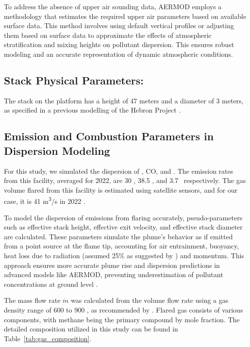 To address the absence of upper air sounding data, AERMOD employs a methodology that estimates the required upper air parameters based on available surface data. This method involves using default vertical profiles or adjusting them based on surface data to approximate the effects of atmospheric stratification and mixing heights on pollutant dispersion. This ensures robust modeling and an accurate representation of dynamic atmospheric conditions.

\subsection{Stack Physical Parameters:}
The stack on the platform has a height of 47 meters and a diameter of 3 meters, as specified in a previous modelling of the Hebron Project \cite{Hebron2010}.

\subsection{Emission and Combustion Parameters in Dispersion Modeling}

For this study, we simulated the dispersion of \NOtwo, CO, and \PMtwoFive. The emission rates from this facility, averaged for 2022, are 30 \gs, 38.5 \gs, and 3.7 \gs~respectively. The gas volume flared from this facility is estimated using satellite sensors, and for our case, it is 41 m\textsuperscript{3}/s in 2022 \cite{WorldBankFlaring}.

To model the dispersion of emissions from flaring accurately, pseudo-parameters such as effective stack height, effective exit velocity, and effective stack diameter are calculated. These parameters simulate the plume's behavior as if emitted from a point source at the flame tip, accounting for air entrainment, buoyancy, heat loss due to radiation (assumed  25\% as suggested by \cite{idriss2003emergency}) and momentum. This approach ensures more accurate plume rise and dispersion predictions in advanced models like AERMOD, preventing underestimation of pollutant concentrations at ground level \cite{Ontario2024}.

The mass flow rate $\dot{m}$ was calculated from the volume flow rate using a gas density range of 600 to 900 \GramMeterCube, as recommended by \cite{elsharkawy2004efficient}. Flared gas consists of various components, with methane being the primary compound by mole fraction. The detailed composition utilized in this study can be found in Table~\ref{tab:gas_composition}.

